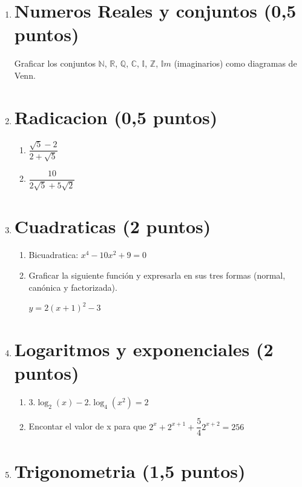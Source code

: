 \documentclass[a4paper,11pt,spanish,sans]{exam}
\begin{document}
\begin{enumerate}
	
\item \section*{Numeros Reales y conjuntos (0,5 puntos) }
Graficar los conjuntos $\mathbb{N}$, $\mathbb{R}$, $\mathbb{Q}$, $\mathbb{C}$, $\mathbb{I}$, $\mathbb{Z}$, $\mathbb{I}m$ (imaginarios) como diagramas de Venn.

\item  \section*{Radicacion (0,5 puntos)}

\begin{enumerate}
	\item $\dfrac{\sqrt{5}-2}{2+\sqrt{5}}$
	\item $\dfrac{10}{2\sqrt{5}+5\sqrt{2}}$
\end{enumerate}

\item  \section*{Cuadraticas (2 puntos)}
\begin{enumerate}
	\item Bicuadratica: $x^4-10x^2+9=0$
	\item Graficar la siguiente función y expresarla en sus tres formas (normal, canónica y factorizada).
	
	$y=2(x+1)^2-3 $
\end{enumerate}

\item  \section*{Logaritmos y exponenciales (2 puntos)}
\begin{enumerate}
	
	\item $3.\log_2(x)-2.\log_4(x^2)=2$
	
	\item Encontar el valor de x para que $2^x+2^{x+1}+\dfrac{5}{4}2^{x+2}=256$
	
\end{enumerate}

\item  \section*{Trigonometria (1,5 puntos)}


\end{enumerate}
\end{document}
